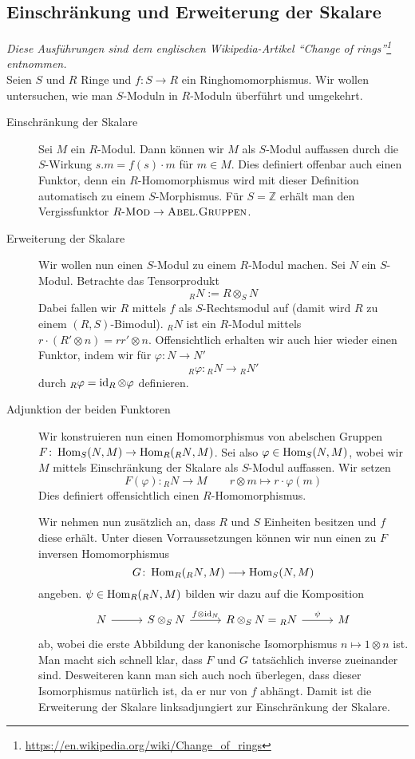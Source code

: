 \subsection{Einschränkung und Erweiterung der Skalare} %
\label{sub:einschrankung_und_erweiterung_der_skalare}
\emph{Diese Ausführungen sind dem englischen Wikipedia-Artikel \enquote{Change of rings}\footnote{\url{https://en.wikipedia.org/wiki/Change_of_rings}} entnommen.}\smallskip\\
Seien $S$ und $R$ Ringe und $f \colon S \to R$ ein Ringhomomorphismus.
Wir wollen untersuchen, wie man $S$-Moduln in $R$-Moduln überführt und umgekehrt.
\begin{description}
	\item[Einschränkung der Skalare]
	Sei $M$ ein $R$-Modul.
	Dann können wir $M$ als $S$-Modul auffassen durch die $S$-Wirkung $s.m = f(s) \cdot m$ für $m \in M$.
	Dies definiert offenbar auch einen Funktor, denn ein $R$-Homomorphismus wird mit dieser Definition automatisch zu einem $S$-Morphismus.
	Für $S=\mathbb{Z}$ erhält man den Vergissfunktor $R\text{-}\textsc{Mod} \to \textsc{Abel.Gruppen}$.
	\item[Erweiterung der Skalare] 
	Wir wollen nun einen $S$-Modul zu einem $R$-Modul machen.
	Sei $N$ ein $S$-Modul.
	Betrachte das Tensorprodukt
	\[
		_R N := R \otimes_S N
	\]
	Dabei fallen wir $R$ mittels $f$ als $S$-Rechtsmodul auf (damit wird $R$ zu einem $(R,S)$-Bimodul).
	$_R N$ ist ein $R$-Modul mittels $r \cdot (R' \otimes n) = rr' \otimes n$.
	Offensichtlich erhalten wir auch hier wieder einen Funktor, indem wir für $\varphi \colon N \to N'$ 
	\[
		_R \varphi \colon {_R N} \longrightarrow {_R N'}
	\]
	durch $_R \varphi = \operatorname{id}_R \otimes \varphi$ definieren.
	\item[Adjunktion der beiden Funktoren] 
	Wir konstruieren nun einen Homomorphismus von abelschen Gruppen $F \colon \operatorname{Hom}_S(N,M) \to \operatorname{Hom}_R({_R N},M)$. 
	Sei also $\varphi \in \operatorname{Hom}_S(N,M)$, wobei wir $M$ mittels Einschränkung der Skalare als $S$-Modul auffassen.
	Wir setzen
	\[
		F(\varphi) \colon {_R N} \longrightarrow M \qquad r \otimes m \longmapsto r \cdot \varphi(m)
	\]
	Dies definiert offensichtlich einen $R$-Homomorphismus.
	
	Wir nehmen nun zusätzlich an, dass $R$ und $S$ Einheiten besitzen und $f$ diese erhält.
	Unter diesen Vorraussetzungen können wir nun einen zu $F$ inversen Homomorphismus 
	\[
		G \colon \operatorname{Hom}_R({_R N},M) \longrightarrow \operatorname{Hom}_S(N,M)
	\]
	angeben.
	$\psi \in \operatorname{Hom}_R({_R N},M)$ bilden wir dazu auf die Komposition
	\[
		\begin{tikzcd}[sep=2.8em]
			N \rar & S \otimes_S N \rar["f \otimes {\id_N}"] & R \otimes_S N = {_R N} \rar["\psi"] & M
		\end{tikzcd}
	\]
	ab, wobei die erste Abbildung der kanonische Isomorphismus $n \mapsto 1 \otimes n$ ist.
	Man macht sich schnell klar, dass $F$ und $G$ tatsächlich inverse zueinander sind.
	Desweiteren kann man sich auch noch überlegen, dass dieser Isomorphismus natürlich ist, da er nur von $f$ abhängt.
	Damit ist die Erweiterung der Skalare linksadjungiert zur Einschränkung der Skalare.
\end{description}
